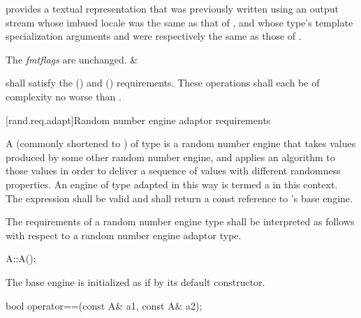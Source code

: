 \begin{libreqtab4d}
    \requires
     provides a textual representation
    that was previously written
    using an output stream
    whose imbued locale
    was the same as that of ,
    and whose type's template specialization arguments
     and 
    were respectively the same as those of .

    \postconditions The \textit{fmtflags} are unchanged.
  & 
  \\
\end{libreqtab4d}

\pnum
{} shall satisfy the
 ()
and  () requirements.
These operations shall each be of complexity
no worse than .


%



[rand.req.adapt]{Random number engine adaptor requirements}%

\pnum
A 
(commonly shortened to )
 of type 
is a random number engine
that takes values
produced by some other random number engine,
and applies an algorithm to those values
in order to deliver a sequence of values
with different randomness properties.
An engine  of type  adapted in this way
is termed a 
in this context.
The expression  shall be valid and shall return a
const reference to 's base engine.

\pnum
The requirements of a random number engine type
shall be interpreted as follows
with respect to a random number engine adaptor type.

\begin{itemdecl}
A::A();
\end{itemdecl}

\begin{itemdescr}
\pnum\effects
 The base engine is initialized
 as if by its default constructor.
\end{itemdescr}

\begin{itemdecl}
bool operator==(const A& a1, const A& a2);
\end{itemdecl}

